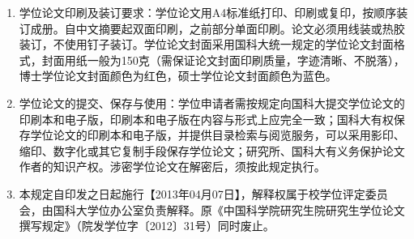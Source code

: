 \begin{enumerate}
  \item 学位论文印刷及装订要求：学位论文用A4标准纸打印、印刷或复印，按顺序装订成册。自中文摘要起双面印刷，之前部分单面印刷。论文必须用线装或热胶装订，不使用钉子装订。学位论文封面采用国科大统一规定的学位论文封面格式，封面用纸一般为150克（需保证论文封面印刷质量，字迹清晰、不脱落），博士学位论文封面颜色为红色，硕士学位论文封面颜色为蓝色。

  \item 学位论文的提交、保存与使用：学位申请者需按规定向国科大提交学位论文的印刷本和电子版，印刷本和电子版在内容与形式上应完全一致；国科大有权保存学位论文的印刷本和电子版，并提供目录检索与阅览服务，可以采用影印、缩印、数字化或其它复制手段保存学位论文；研究所、国科大有义务保护论文作者的知识产权。涉密学位论文在解密后，须按此规定执行。

  \item 本规定自印发之日起施行【2013年04月07日】，解释权属于校学位评定委员会，由国科大学位办公室负责解释。原《中国科学院研究生院研究生学位论文撰写规定》（院发学位字〔2012〕31号）同时废止。
\end{enumerate}
